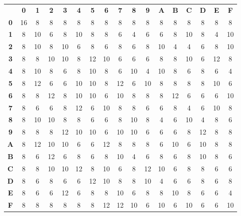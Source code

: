 \documentclass{../sftex/sftex}
\begin{document}
\begin{enumerate}
    \begin{tabular}{>{\bfseries}c*{16}c}
        & \textbf{0} & \textbf{1} & \textbf{2} & \textbf{3}
        & \textbf{4} & \textbf{5} & \textbf{6} & \textbf{7}
        & \textbf{8} & \textbf{9} & \textbf{A} & \textbf{B}
        & \textbf{C} & \textbf{D} & \textbf{E} & \textbf{F} \\
        0   & 16 & 8  & 8  & 8  & 8  & 8  & 8  & 8
            & 8  & 8  & 8  & 8  & 8  & 8  & 8  & 8          \\
        1   & 8  & 10 & 6  & 8  & 10 & 8  & 8  & 6
            & 4  & 6  & 6  & 8  & 10 & 8  & 4  & 10         \\
        2   & 8  & 10 & 8  & 10 & 6  & 8  & 6  & 8
            & 6  & 8  & 10 & 4  & 4  & 6  & 8  & 10         \\
        3   & 8  & 8  & 10 & 10 & 8  & 12 & 10 & 6
            & 6  & 6  & 8  & 8  & 10 & 6  & 12 & 8          \\
        4   & 8  & 10 & 8  & 6  & 8  & 10 & 8  & 6
            & 10 & 4  & 10 & 8  & 6  & 8  & 6  & 4          \\
        5   & 8  & 12 & 6  & 6  & 10 & 10 & 8  & 12
            & 6  & 10 & 8  & 8  & 8  & 8  & 10 & 6          \\
        6   & 8  & 8  & 12 & 8  & 10 & 10 & 6  & 10
            & 8  & 8  & 8  & 12 & 6  & 6  & 6  & 10         \\
        7   & 8  & 6  & 6  & 8  & 12 & 6  & 10 & 8
            & 8  & 6  & 6  & 8  & 4  & 6  & 10 & 8          \\
        8   & 8  & 10 & 10 & 8  & 8  & 6  & 6  & 8
            & 10 & 8  & 4  & 6  & 10 & 4  & 8  & 6          \\
        9   & 8  & 8  & 8  & 12 & 10 & 10 & 6  & 10
            & 10 & 6  & 6  & 6  & 8  & 12 & 8  & 8          \\
        A   & 8  & 12 & 10 & 10 & 6  & 6  & 12 & 8
            & 8  & 8  & 6  & 10 & 6  & 10 & 8  & 8          \\
        B   & 8  & 6  & 12 & 6  & 8  & 6  & 8  & 10
            & 4  & 6  & 8  & 6  & 8  & 10 & 8  & 6          \\
        C   & 8  & 8  & 10 & 10 & 12 & 8  & 10 & 6
            & 8  & 12 & 10 & 6  & 8  & 8  & 6  & 6          \\
        D   & 8  & 6  & 8  & 6  & 6  & 12 & 10 & 8
            & 8  & 10 & 4  & 6  & 6  & 8  & 6  & 8          \\
        E   & 8  & 6  & 6  & 12 & 6  & 8  & 8  & 10
            & 6  & 8  & 8  & 10 & 8  & 6  & 6  & 4          \\
        F   & 8  & 8  & 8  & 8  & 8  & 8  & 12 & 12
            & 10 & 6  & 10 & 6  & 10 & 6  & 6  & 10         \\
    \end{tabular}


\end{enumerate}
\end{document}
